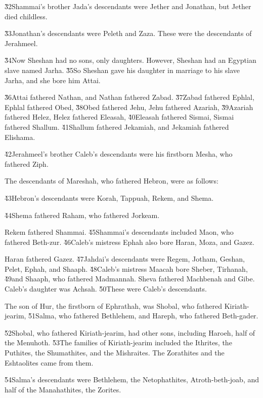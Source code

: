\v{32}Shammai's brother Jada's descendants were Jether and Jonathan, but Jether died childless.

\v{33}Jonathan's descendants were Peleth and Zaza. These were the descendants of Jerahmeel.

\v{34}Now Sheshan had no sons, only daughters. However, Sheshan had an Egyptian slave named Jarha. \v{35}So Sheshan gave his daughter in marriage to his slave Jarha, and she bore him Attai.

\v{36}Attai fathered Nathan, and Nathan fathered Zabad. \v{37}Zabad fathered Ephlal, Ephlal fathered Obed, \v{38}Obed fathered Jehu, Jehu fathered Azariah, \v{39}Azariah fathered Helez, Helez fathered Eleasah, \v{40}Eleasah fathered Sismai, Sismai fathered Shallum. \v{41}Shallum fathered Jekamiah, and Jekamiah fathered Elishama.

\v{42}Jerahmeel's brother Caleb's descendants were his firstborn Mesha, who fathered Ziph.

The descendants of Mareshah, who fathered Hebron, were as follows:

\v{43}Hebron's descendants were Korah, Tappuah, Rekem, and Shema.

\v{44}Shema fathered Raham, who fathered Jorkeam.

Rekem fathered Shammai. \v{45}Shammai's descendants included Maon, who fathered Beth-zur. \v{46}Caleb's mistress Ephah also bore Haran, Moza, and Gazez.

Haran fathered Gazez. \v{47}Jahdai's descendants were Regem, Jotham, Geshan, Pelet, Ephah, and Shaaph. \v{48}Caleb's mistress Maacah bore Sheber, Tirhanah, \v{49}and Shaaph, who fathered Madmannah. Sheva fathered Machbenah and Gibe. Caleb's daughter was Achsah. \v{50}These were Caleb's descendants.

The son of Hur, the firstborn of Ephrathah, was Shobal, who fathered Kiriath-jearim, \v{51}Salma, who fathered Bethlehem, and Hareph, who fathered Beth-gader.

\v{52}Shobal, who fathered Kiriath-jearim, had other sons, including Haroeh, half of the Menuhoth. \v{53}The families of Kiriath-jearim included the Ithrites, the Puthites, the Shumathites, and the Mishraites. The Zorathites and the Eshtaolites came from them.

\v{54}Salma's descendants were Bethlehem, the Netophathites, Atroth-beth-joab, and half of the Manahathites, the Zorites.

